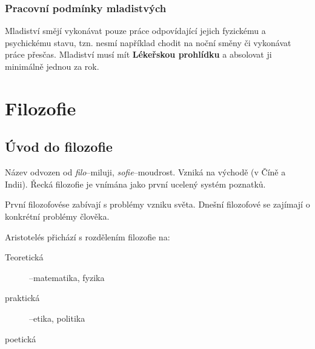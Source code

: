 \documentclass[10pt,a4paper,
twoside,%
]{report}
\begin{document}
\section{Pracovní podmínky mladistvých}
Mladiství smějí vykonávat pouze práce odpovídající jejich fyzickému a psychickému stavu, tzn. nesmí například chodit na noční směny či vykonávat práce přesčas. Mladiství musí mít \textbf{Lékeřskou prohlídku} a absolovat ji minimálně jednou za rok. 

\part{Filozofie}

\chapter{Úvod do filozofie}

Název odvozen od \textit{filo}--miluji, \textit{sofie}--moudrost. Vzniká na východě (v Číně a Indii). Řecká filozofie je vnímána jako první ucelený systém poznatků.

První filozofovése zabívají s problémy vzniku světa. Dnešní filozofové se zajímají o konkrétní problémy člověka.


Aristotelés přichází s rozdělením filozofie na:
\begin{description}
\item[Teoretická]--matematika, fyzika
\item[praktická]--etika, politika
\item[poetická]
\end{description}
\end{document}
